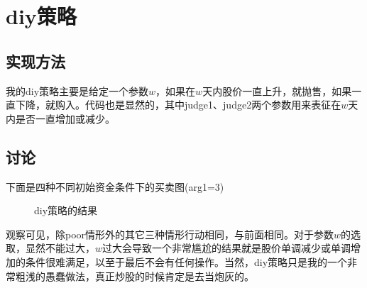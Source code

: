 \documentclass{ctexart}
\begin{document}
	\section{diy策略}
	\subsection{实现方法}
	我的diy策略主要是给定一个参数$w$，如果在$w$天内股价一直上升，就抛售，如果一直下降，就购入。代码也是显然的，其中judge1、judge2两个参数用来表征在$w$天内是否一直增加或减少。
	\subsection{讨论}
	下面是四种不同初始资金条件下的买卖图(arg1=3)
	\begin{figure}[H]
		\centering
	\end{figure}
	\begin{figure}[H]
		\centering
	\end{figure}
	\begin{figure}[H]
		\centering
	\end{figure}
	\begin{figure}[H]
		\centering
		\caption{diy策略的结果}
	\end{figure}
	观察可见，除poor情形外的其它三种情形行动相同，与前面相同。对于参数$w$的选取，显然不能过大，$w$过大会导致一个非常尴尬的结果就是股价单调减少或单调增加的条件很难满足，以至于最后不会有任何操作。当然，diy策略只是我的一个非常粗浅的愚蠢做法，真正炒股的时候肯定是去当炮灰的。
\end{document}
